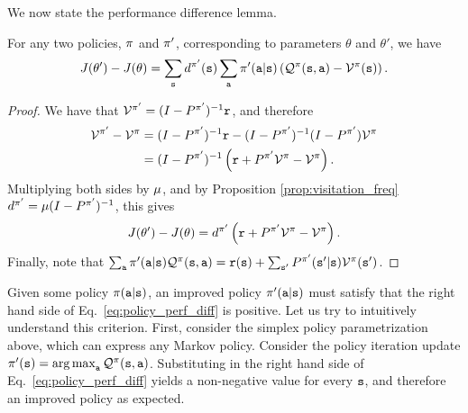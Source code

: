 We now state the performance difference lemma.
\begin{lemma}\label{lemma:perf_diff}
    For any two policies, $\pi$ and $\pi'$, corresponding to parameters $\theta$ and $\theta'$, we have
    \begin{equation}\label{eq:policy_perf_diff}
        J(\theta') - J(\theta)= \sum_{{\tt s}} d^{\pi'}({\tt s}) \sum_{\tt a} \pi'({\tt a}|{\tt s})\left( \mathcal{Q}^{\pi}({\tt s},{\tt a}) - \mathcal{V}^{\pi}({\tt s})\right).
    \end{equation}
\end{lemma}
\begin{proof}
    We have that $\mathcal{V}^{\pi'} = (I - P^{\pi'})^{-1}{\tt r}$, and therefore
    \begin{equation*}
    \begin{split}
        \mathcal{V}^{\pi'} - \mathcal{V}^\pi &= (I - P^{\pi'})^{-1}{\tt r} - (I - P^{\pi'})^{-1} (I - P^{\pi'}) \mathcal{V}^\pi \\
        &=(I - P^{\pi'})^{-1} \left({\tt r} +P^{\pi'}\mathcal{V}^\pi - \mathcal{V}^\pi \right).
    \end{split}
    \end{equation*}
    Multiplying both sides by $\mu$, and by Proposition \ref{prop:visitation_freq} $d^{\pi'}=\mu (I - P^{\pi'})^{-1}$, this gives
    \begin{equation*}
        J(\theta') - J(\theta) = d^{\pi'}\left({\tt r} +P^{\pi'}\mathcal{V}^\pi - \mathcal{V}^\pi \right).
    \end{equation*}
    Finally, note that $\sum_{\tt a} \pi'({\tt a}|{\tt s}) \mathcal{Q}^{\pi}({\tt s},{\tt a}) = {\tt r}({\tt s}) + \sum_{{\tt s}'}P^{\pi'}({\tt s}'|{\tt s})\mathcal{V}^{\pi}({\tt s}')$.
\end{proof}

Given some policy $\pi({\tt a}|{\tt s})$, an improved policy $\pi'({\tt a}|{\tt s})$ must satisfy that the right hand side of Eq.~\ref{eq:policy_perf_diff} is positive.
Let us try to intuitively understand this criterion. First, consider the simplex policy parametrization above, which can express any Markov policy.  Consider the policy iteration update $\policy'(\state) = \argmax_{\action} \QValue^{\policy}(\state,\action)$. Substituting in the right hand side of Eq.~\ref{eq:policy_perf_diff} yields a non-negative value for every ${\tt s}$, and therefore an improved policy as expected.

